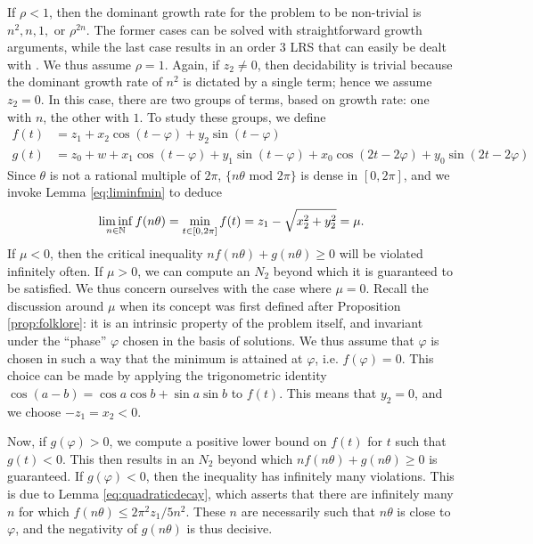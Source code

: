If $\rho < 1$, then the dominant growth rate for the problem to be non-trivial is $n^2, n, 1, $ or $\rho^{2n}$. The former cases can be solved with straightforward growth arguments, while the last case results in an order 3 LRS that can easily be dealt with \cite{ouaknine2014positivity,joeljames3}. We thus assume $\rho = 1$. Again, if $z_2 \ne 0$, then decidability is trivial because the dominant growth rate of $n^2$ is dictated by a single term; hence we assume $z_2 = 0$. In this case, there are two groups of terms, based on growth rate: one with $n$, the other with $1$. To study these groups, we define
\begin{align}
f(t) &= z_1 + x_2 \cos(t -\varphi) + y_2\sin(t - \varphi) \\
g(t) &= z_0 + w + x_1\cos(t - \varphi) + y_1\sin(t - \varphi) + x_0 \cos(2t - 2\varphi) + y_0\sin(2t-2\varphi)
\end{align}
Since $\theta$ is not a rational multiple of $2\pi$, $\{n\theta \text{ mod } 2\pi\}$ is dense in $[0, 2\pi]$, and we invoke Lemma \ref{eq:liminfmin} to deduce
\begin{equation}
\liminf_{n\in \mathbb{N}} f(n\theta) = \min_{t \in [0, 2\pi]} f(t) = z_1 -\sqrt{x_2^2 + y_2^2} = \mu.
\end{equation}
If $\mu < 0$, then the critical inequality $nf(n\theta) + g(n\theta) \ge 0$ will be violated infinitely often. If $\mu > 0$, we can compute an $N_2$ beyond which it is guaranteed to be satisfied. We thus concern ourselves with the case where $\mu = 0$. Recall the discussion around $\mu$ when its concept was first defined after Proposition \ref{prop:folklore}: it is an intrinsic property of the problem itself, and invariant under the ``phase'' $\varphi$ chosen in the basis of solutions. We thus assume that $\varphi$ is chosen in such a way that the minimum is attained at $\varphi$, i.e. $f(\varphi) = 0$. This choice can be made by applying the trigonometric identity $\cos(a - b) = \cos a \cos b + \sin a \sin b$ to $f(t)$. This means that $y_2 = 0$, and we choose $-z_1 = x_2 < 0$.

Now, if $g(\varphi) > 0$, we compute a positive lower bound on $f(t)$ for $t$ such that $g(t) < 0$. This then results in an $N_2$ beyond which $nf(n\theta) + g(n\theta) \ge 0$ is guaranteed. If $g(\varphi) < 0$, then the inequality has infinitely many violations. This is due to Lemma \ref{eq:quadraticdecay}, which asserts that there are infinitely many $n$ for which $f(n\theta) \le 2\pi^2z_1/5n^2$. These $n$ are necessarily such that $n\theta$ is close to $\varphi$, and the negativity of $g(n\theta)$ is thus decisive.

